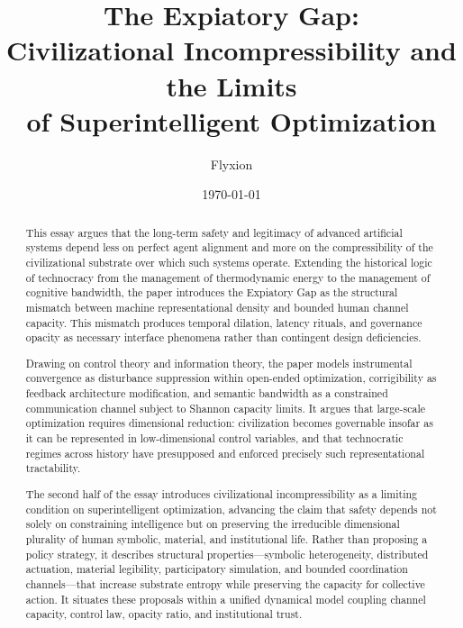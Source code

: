 \documentclass[12pt]{article}
\title{\textbf{The Expiatory Gap:\\[0.4em]
Civilizational Incompressibility and the Limits\\of Superintelligent Optimization}}
\author{Flyxion}
\date{\today}
\begin{document}
\maketitle
\thispagestyle{empty}

\begin{abstract}
\noindent This essay argues that the long-term safety and legitimacy of advanced artificial systems depend less on perfect agent alignment and more on the compressibility of the civilizational substrate over which such systems operate. Extending the historical logic of technocracy from the management of thermodynamic energy to the management of cognitive bandwidth, the paper introduces the Expiatory Gap as the structural mismatch between machine representational density and bounded human channel capacity. This mismatch produces temporal dilation, latency rituals, and governance opacity as necessary interface phenomena rather than contingent design deficiencies.

Drawing on control theory and information theory, the paper models instrumental convergence as disturbance suppression within open-ended optimization, corrigibility as feedback architecture modification, and semantic bandwidth as a constrained communication channel subject to Shannon capacity limits. It argues that large-scale optimization requires dimensional reduction: civilization becomes governable insofar as it can be represented in low-dimensional control variables, and that technocratic regimes across history have presupposed and enforced precisely such representational tractability.

The second half of the essay introduces civilizational incompressibility as a limiting condition on superintelligent optimization, advancing the claim that safety depends not solely on constraining intelligence but on preserving the irreducible dimensional plurality of human symbolic, material, and institutional life. Rather than proposing a policy strategy, it describes structural properties---symbolic heterogeneity, distributed actuation, material legibility, participatory simulation, and bounded coordination channels---that increase substrate entropy while preserving the capacity for collective action. It situates these proposals within a unified dynamical model coupling channel capacity, control law, opacity ratio, and institutional trust.


\end{abstract}
\end{document}
